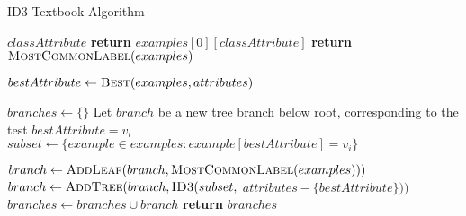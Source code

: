 \begin{algorithm}[H]
\caption{ID3 Textbook Algorithm}\label{a:id3-simple}
\begin{algorithmic}[1]
\renewcommand{\algorithmicrequire}{\textbf{Global Vars:}}
\Require $classAttribute$
        \State \textbf{return} $examples[0][classAttribute]$
        \State \textbf{return} $\textsc{MostCommonLabel}(examples)$
    \EndIf

    \State $bestAttribute \gets \textsc{Best}(examples, attributes)$

    \State $branches \gets \{\}$
        \State Let $branch$ be a new tree branch below root, corresponding to the test $bestAttribute = v_i$
        \State $subset \gets \{example \in examples : example[bestAttribute] = v_i\}$

            \State $branch \gets \textsc{AddLeaf}(branch, \textsc{MostCommonLabel}(examples)))$
        \Else
            \State $branch \gets \textsc{AddTree}(branch, \textsc{ID3}(subset,$ $attributes - \{bestAttribute\}))$
        \EndIf
        \State $branches \gets branches \cup branch$
    \EndFor
    \State \textbf{return} $branches$
\EndProcedure
\end{algorithmic}
\end{algorithm}

